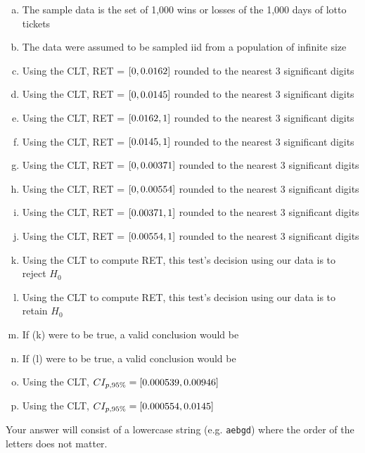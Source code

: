 \documentclass[12pt,landscape]{article}
\newcommand{\instr}{\small Your answer will consist of a lowercase string (e.g. \texttt{aebgd}) where the order of the letters does not matter. \normalsize}
\begin{document}
\vspace{-0.2cm}\benum{} 
\begin{enumerate}[(a)]
\item The sample data is the set of 1,000 wins or losses of the 1,000 days of lotto tickets
\item The data were assumed to be sampled iid from a population of infinite size

\item Using the CLT, RET = $\left[0, 0.0162\right]$ rounded to the nearest 3 significant digits
\item Using the CLT, RET = $\left[0, 0.0145\right]$ rounded to the nearest 3 significant digits
\item Using the CLT, RET = $\left[0.0162, 1\right]$ rounded to the nearest 3 significant digits
\item Using the CLT, RET = $\left[0.0145, 1\right]$ rounded to the nearest 3 significant digits

\item Using the CLT, RET = $\left[0, 0.00371\right]$ rounded to the nearest 3 significant digits
\item Using the CLT, RET = $\left[0, 0.00554\right]$ rounded to the nearest 3 significant digits
\item Using the CLT, RET = $\left[0.00371, 1\right]$ rounded to the nearest 3 significant digits
\item Using the CLT, RET = $\left[0.00554, 1\right]$ rounded to the nearest 3 significant digits

\item Using the CLT to compute RET, this test's decision using our data is to reject $H_0$
\item Using the CLT to compute RET, this test's decision using our data is to retain $H_0$

\item If (k) were to be true, a valid conclusion would be 
\item If (l) were to be true, a valid conclusion would be 

\item Using the CLT, $CI_{p, 95\%} = \left[0.000539, 0.00946\right]$
\item Using the CLT, $CI_{p, 95\%} = \left[0.000554, 0.0145\right]$
\end{enumerate}
\eenum\instr\pagebreak
\end{document}
